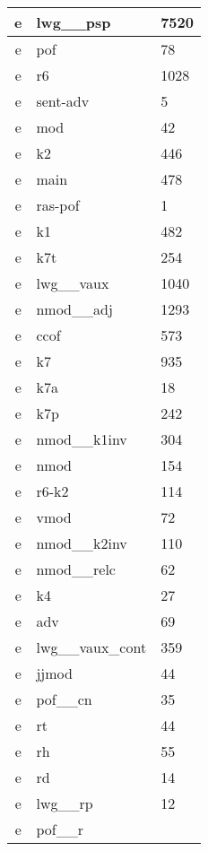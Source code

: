 \documentclass[a4 paper]{article}
\begin{document}
\begin{longtable}{cp{}p{}}
e & lwg\_\_psp & 7520\\ \midrule e & pof & 78\\ \midrule e & r6 & 1028\\ \midrule e & sent-adv & 5\\ \midrule e & mod & 42\\ \midrule e & k2 & 446\\ \midrule e & main & 478\\ \midrule e & ras-pof & 1\\ \midrule e & k1 & 482\\ \midrule e & k7t & 254\\ \midrule e & lwg\_\_vaux & 1040\\ \midrule e & nmod\_\_adj & 1293\\ \midrule e & ccof & 573\\ \midrule e & k7 & 935\\ \midrule e & k7a & 18\\ \midrule e & k7p & 242\\ \midrule e & nmod\_\_k1inv & 304\\ \midrule e & nmod & 154\\ \midrule e & r6-k2 & 114\\ \midrule e & vmod & 72\\ \midrule e & nmod\_\_k2inv & 110\\ \midrule e & nmod\_\_relc & 62\\ \midrule e & k4 & 27\\ \midrule e & adv & 69\\ \midrule e & lwg\_\_vaux\_cont & 359\\ \midrule e & jjmod & 44\\ \midrule e & pof\_\_cn & 35\\ \midrule e & rt & 44\\ \midrule e & rh & 55\\ \midrule e & rd & 14\\ \midrule e & lwg\_\_rp & 12\\ \midrule e & pof\_\_r
\end{longtable}
\end{document}
